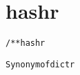 \section{hashr}
\begin{shaded}
\begin{alltt}
/** hashr

  Synonym of dictr

\end{alltt}
\end{shaded}
